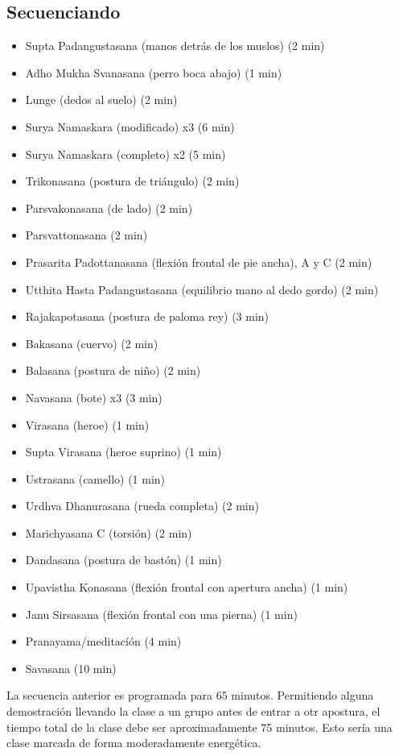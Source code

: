 \subsection{Secuenciando}
\begin{itemize}
	\item Supta Padangustasana (manos detrás de los muslos) (2 min)
	\item Adho Mukha Svanasana (perro boca abajo) (1 min)
	\item Lunge (dedos al suelo) (2 min)
	\item Surya Namaskara (modificado) x3 (6 min)
	\item Surya Namaskara (completo) x2 (5 min)
	\item Trikonasana (postura de triángulo) (2 min)
	\item Parsvakonasana (de lado) (2 min)
	\item Parsvattonasana (2 min)
	\item Prasarita Padottanasana (flexión frontal de pie ancha), A y C (2 min)
	\item Utthita Hasta Padangustasana (equilibrio mano al dedo gordo) (2 min)
	\item Rajakapotasana (postura de paloma rey) (3 min)
	\item Bakasana (cuervo) (2 min)
	\item Balasana (postura de niño) (2 min)
	\item Navasana (bote) x3 (3 min)
	\item Virasana (heroe) (1 min)
	\item Supta Virasana (heroe suprino) (1 min)
	\item Ustrasana (camello) (1 min)
	\item Urdhva Dhanurasana (rueda completa) (2 min)
	\item Marichyasana C (torsión) (2 min)
	\item Dandasana (postura de bastón) (1 min)
	\item Upavistha Konasana (flexión frontal con apertura ancha) (1 min)
	\item Janu Sirsasana (flexión frontal con una pierna) (1 min)
	\item Pranayama/meditacíón (4 min)
	\item Savasana (10 min)
\end{itemize}

La secuencia anterior es programada para 65 minutos. Permitiendo alguna demostración llevando la clase a un grupo antes de entrar a otr apostura, el tiempo total de la clase debe ser aproximadamente 75 minutos. Esto sería una clase marcada de forma moderadamente energ\'etica.

